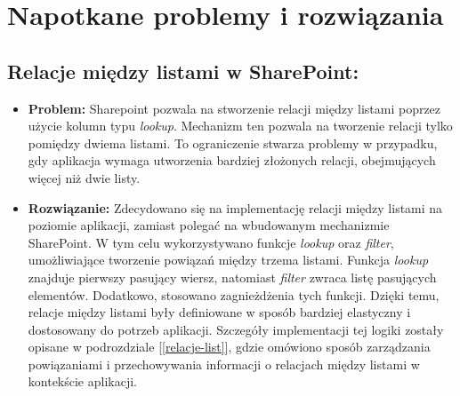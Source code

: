 \chapter{Napotkane problemy i rozwiązania}


\section*{Relacje między listami w SharePoint:}
            \begin{itemize}
                  \item \textbf{Problem:}
                        Sharepoint pozwala na stworzenie relacji między listami poprzez użycie kolumn typu \emph{lookup}. Mechanizm ten pozwala na tworzenie relacji tylko pomiędzy dwiema listami. To ograniczenie stwarza problemy w przypadku, gdy aplikacja wymaga utworzenia bardziej złożonych relacji, obejmujących więcej niż dwie listy.
                  \item \textbf{Rozwiązanie:} Zdecydowano się na implementację relacji między listami na poziomie aplikacji, zamiast polegać na wbudowanym mechanizmie SharePoint. W tym celu wykorzystywano funkcje \emph{lookup} oraz \emph{filter}, umożliwiające tworzenie powiązań między trzema listami. Funkcja \emph{lookup} znajduje pierwszy pasujący wiersz, natomiast \emph{filter} zwraca listę pasujących elementów. Dodatkowo, stosowano zagnieżdżenia tych funkcji. Dzięki temu, relacje między listami były definiowane w sposób bardziej elastyczny i dostosowany do potrzeb aplikacji. Szczegóły implementacji tej logiki zostały opisane w podrozdziale [\ref{relacje-list}], gdzie omówiono sposób zarządzania powiązaniami i przechowywania informacji o relacjach między listami w kontekście aplikacji.
            \end{itemize}

